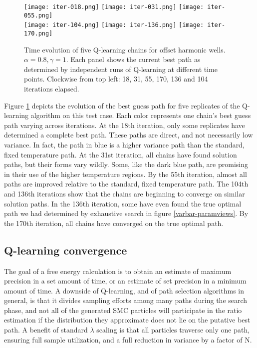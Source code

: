 \begin{figure}
    \centering
    \texttt{[image: iter-018.png]}
    \texttt{[image: iter-031.png]}
    \texttt{[image: iter-055.png]} \\
    \texttt{[image: iter-104.png]}
    \texttt{[image: iter-136.png]}
    \texttt{[image: iter-170.png]}
    \caption[Time evolution of five Q-learning chains]{Time evolution of five Q-learning chains for offset harmonic wells. $\alpha=0.8, \gamma=1$. Each panel shows the current best path as determined by independent runs of Q-learning at different time points. Clockwise from top left: 18, 31, 55, 170, 136 and 104 iterations elapsed.}
    \label{fig:ql-slices}
\end{figure}


Figure \ref{fig:ql-slices} depicts the evolution of the best guess path for five replicates of the Q-learning algorithm on this test case.
Each color represents one chain's best guess path varying across iterations.
At the 18th iteration, only some replicates have determined a complete best path. These paths are direct, and not necessarily low variance. In fact, the path in blue is a higher variance path than the standard, fixed temperature path.
At the 31st iteration, all chains have found solution paths, but their forms vary wildly. 
Some, like the dark blue path, are promising in their use of the higher temperature regions.
By the 55th iteration, almost all paths are improved relative to the standard, fixed temperature path. 
The 104th and 136th iterations show that the chains are beginning to converge on similar solution paths. In the 136th iteration, some have even found the true optimal path we had determined by exhaustive search in figure \ref{varbar-paramviews}.
By the 170th iteration, all chains have converged on the true optimal path.

\subsection{Q-learning convergence} %
\label{sub:q_learning_convergence}

The goal of a free energy calculation is to obtain an estimate of maximum precision in a set amount of time, or an estimate of set precision in a minimum amount of time.
A downside of Q-learning, and of path selection algorithms in general, is that it divides sampling efforts among many paths during the search phase, and not all of the generated SMC particles will participate in the ratio estimation if the distribution they approximate does not lie on the putative best path.
A benefit of standard $\lambda$ scaling is that all particles traverse only one path, ensuring full sample utilization, and a full reduction in variance by a factor of N.

